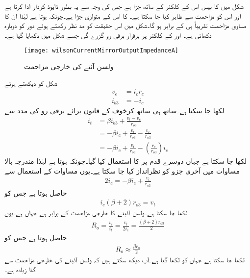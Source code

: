شکل  میں  کا بیس اس کے کلکٹر کے ساتھ جڑا ہے جس  کی وجہ سے یہ بطور ڈایوڈ کردار ادا کرتا ہے اور اس کو مزاحمت  سے ظاہر کیا جا سکتا ہے۔ کا  اس  کے متوازی جڑا ہے۔چونکہ  ہوتا ہے لہٰذا ان کا مساوی مزاحمت تقریباً  ہی کے برابر ہو گا۔شکل  میں اس حقیقت کو مد نظر رکھتے ہوئے دور کو دوبارہ دکھائی ہے۔ اور  کے کلکٹر پر برقرار  برقی رو گزرے گی جسے شکل میں دکھایا گیا ہے۔
\begin{figure}
\centering
\texttt{[image: wilsonCurrentMirrorOutputImpedanceA]}
\caption{ولسن آئنے کی خارجی مزاحمت}
\label{شکل_تفرقی_ولسن_آئینے_کی_خارجی_مزاحمت_الف}
\end{figure}
شکل کو دیکھتے ہوئے
\begin{align*}
v_e&=i_c r_e\\
i_{b3}&=-i_c
\end{align*}
لکھا جا سکتا ہے۔ساتھ ہی ساتھ کرخوف کے قانون برائے برقی رو کی مدد سے
\begin{align*}
i_t&=\beta i_{b3} +\frac{v_t-v_e}{r_{o3}}\\
&=-\beta i_c +\frac{v_t}{r_{o3}}-\frac{v_e}{r_{o3}}\\
&=-\beta i_c +\frac{v_t}{r_{o3}}-\left(\frac{r_e}{r_{o3}}\right) i_c
\end{align*}
لکھا جا سکتا ہے جہاں دوسرے قدم پر  کا استعمال کیا گیا۔چونکہ  ہوتا ہے لہٰذا مندرجہ بالا مساوات میں آخری جزو کو نظرانداز کیا جا سکتا ہے۔یوں مساوات  کے استعمال سے 
\begin{align*}
2 i_c=-\beta i_c +\frac{v_t}{r_{o3}}
\end{align*}
حاصل ہوتا ہے جس کو
\begin{align*}
i_c \left(\beta+2 \right) r_{o3}=v_t
\end{align*}
لکھا جا سکتا ہے۔ولسن آئینے کا خارجی مزاحمت  کے برابر ہے جہاں  ہے۔یوں
\begin{align}
R_o=\frac{v_t}{i_t}=\frac{v_t}{2 i_c}=\frac{\left(\beta+2 \right) r_{o3}}{2}
\end{align}
حاصل ہوتا ہے جس کو
\begin{align} \label{مساوات_تفرقی_ولسن_کی_خارجی_مزاحمت}
R_o \approx \frac{\beta r_{o}}{2}
\end{align}
لکھا جا سکتا ہے جہاں  کو  لکھا گیا ہے۔آپ دیکھ سکتے ہیں کہ ولسن آئینے کی خارجی مزاحمت  سے  گنا زیادہ ہے۔



